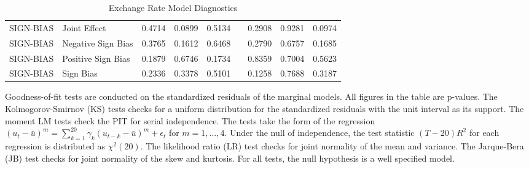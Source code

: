 \documentclass[12pt]{article}
\begin{document}
\begin{table}
\begin{tabular}[c]{l l r r r c r r r}
SIGN-BIAS &       Joint Effect & 0.4714 & 0.0899 & 0.5134 & & 0.2908 & 0.9281 & 0.0974 \\
SIGN-BIAS & Negative Sign Bias & 0.3765 & 0.1612 & 0.6468 & & 0.2790 & 0.6757 & 0.1685 \\
SIGN-BIAS & Positive Sign Bias & 0.1879 & 0.6746 & 0.1734 & & 0.8359 & 0.7004 & 0.5623 \\
SIGN-BIAS &          Sign Bias & 0.2336 & 0.3378 & 0.5101 & & 0.1258 & 0.7688 & 0.3187 \\				 
\hline \hline
	\end{tabular}
	\caption{Exchange Rate Model Diagnostics}
	\begin{tablenotes}
	\item[]{\footnotesize Goodness-of-fit tests are conducted on the standardized residuals of the marginal models. All figures in the table are p-values. The Kolmogorov-Smirnov (KS) tests checks for a uniform distribution for the standardized residuals with the unit interval as its support. The moment LM tests check the PIT for serial independence. The tests take the form of the regression $\left(u_{t} - \bar{u}\right)^{m} = \sum_{k=1}^{20}\gamma_{k}\left(u_{t-k} - \bar{u}\right)^{m} + \epsilon_{t}$ for $m = 1,...,4$. Under the null of independence, the test statistic $\left(T - 20\right) R^{2}$ for each regression is distributed as $\chi^{2}\left(20\right)$. The likelihood ratio (LR) test checks for joint normality of the mean and variance. The Jarque-Bera (JB) test checks for joint normality of the skew and kurtosis. For all tests, the null hypothesis is a well specified model.}
	\end{tablenotes}
\end{table}
\end{document}
